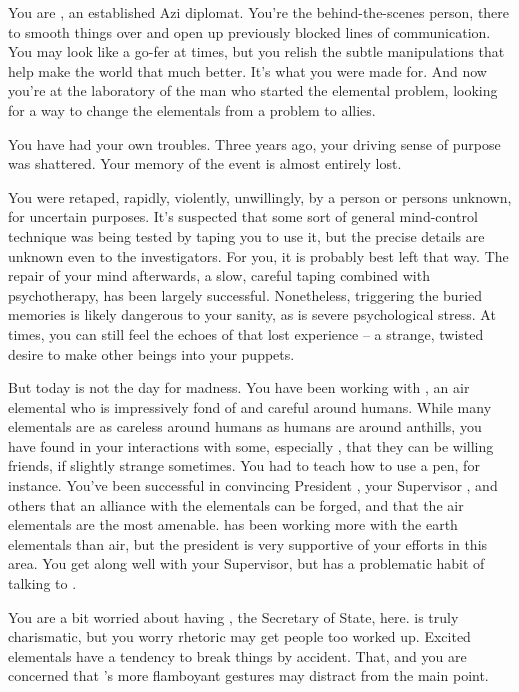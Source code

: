 \documentclass[char]{elementals}
\begin{document}
\name{\cDiplomat{}}

You are \cDiplomat{\intro}, an established Azi diplomat.  You're the behind-the-scenes person, there to smooth things over and open up previously blocked lines of communication.  You may look like a go-fer at times, but you relish the subtle manipulations that help make the world that much better.  It's what you were made for.  And now you're at the laboratory of the man who started the elemental problem, looking for a way to change the elementals from a problem to allies.

You have had your own troubles.  Three years ago, your driving sense of purpose was shattered.  Your memory of the event is almost entirely lost.

You were retaped, rapidly, violently, unwillingly, by a person or persons unknown, for uncertain purposes.  It's suspected that some sort of general mind-control technique was being tested by taping you to use it, but the precise details are unknown even to the investigators.  For you, it is probably best left that way.  The repair of your mind afterwards, a slow, careful taping combined with psychotherapy, has been largely successful.  Nonetheless, triggering the buried memories is likely dangerous to your sanity, as is severe psychological stress.  At times, you can still feel the echoes of that lost experience -- a strange, twisted desire to make other beings into your puppets.

But today is not the day for madness.  You have been working with \cNaturalist{\intro}, an air elemental who is impressively fond of and careful around humans.  While many elementals are as careless around humans as humans are around anthills, you have found in your interactions with some, especially \cNaturalist{}, that they can be willing friends, if slightly strange sometimes.  You had to teach \cNaturalist{\them} how to use a pen, for instance.  You've been successful in convincing President \cLeader{\intro}, your Supervisor \cAvatar{\intro}, and others that an alliance with the elementals can be forged, and that the air elementals are the most amenable.  \cAvatar{} has been working more with the earth elementals than air, but the president is very supportive of your efforts in this area.  You get along well with your Supervisor, but \cAvatar{} has a problematic habit of talking to \cAvatar{\themself}.

You are a bit worried about having \cDema{\intro}, the Secretary of State, here.  \cDema{\They} is truly charismatic, but you worry \cDema{\their} rhetoric may get people too worked up.  Excited elementals have a tendency to break things by accident.  That, and you are concerned that \cDema{}'s more flamboyant gestures may distract from the main point.
\end{document}

